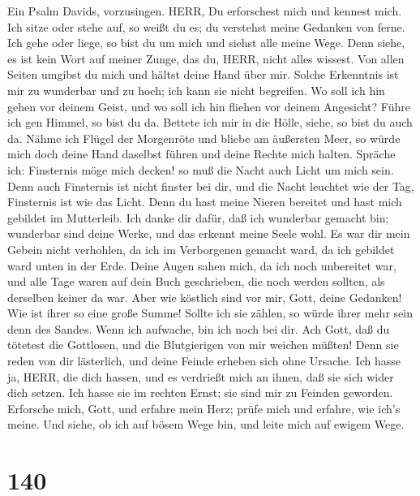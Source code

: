  Ein Psalm Davids, vorzusingen. HERR, Du erforschest mich
und kennest mich.  Ich sitze oder stehe auf, so weißt du es;
du verstehst meine Gedanken von ferne.  Ich gehe oder liege,
so bist du um mich und siehst alle meine Wege.  Denn siehe,
es ist kein Wort auf meiner Zunge, das du, HERR, nicht alles wissest.
 Von allen Seiten umgibst du mich und hältst deine Hand über
mir.  Solche Erkenntnis ist mir zu wunderbar und zu hoch;
ich kann sie nicht begreifen.  Wo soll ich hin gehen vor
deinem Geist, und wo soll ich hin fliehen vor deinem Angesicht?
 Führe ich gen Himmel, so bist du da. Bettete ich mir in die
Hölle, siehe, so bist du auch da.  Nähme ich Flügel der
Morgenröte und bliebe am äußersten Meer,  so würde mich
doch deine Hand daselbst führen und deine Rechte mich halten.
 Spräche ich: Finsternis möge mich decken! so muß die Nacht
auch Licht um mich sein.  Denn auch Finsternis ist nicht
finster bei dir, und die Nacht leuchtet wie der Tag, Finsternis ist wie
das Licht.  Denn du hast meine Nieren bereitet und hast
mich gebildet im Mutterleib.  Ich danke dir dafür, daß ich
wunderbar gemacht bin; wunderbar sind deine Werke, und das erkennt meine
Seele wohl.  Es war dir mein Gebein nicht verhohlen, da ich
im Verborgenen gemacht ward, da ich gebildet ward unten in der Erde.
 Deine Augen sahen mich, da ich noch unbereitet war, und
alle Tage waren auf dein Buch geschrieben, die noch werden sollten, als
derselben keiner da war.  Aber wie köstlich sind vor mir,
Gott, deine Gedanken! Wie ist ihrer so eine große Summe! 
Sollte ich sie zählen, so würde ihrer mehr sein denn des Sandes. Wenn
ich aufwache, bin ich noch bei dir.  Ach Gott, daß du
tötetest die Gottlosen, und die Blutgierigen von mir weichen müßten!
 Denn sie reden von dir lästerlich, und deine Feinde
erheben sich ohne Ursache.  Ich hasse ja, HERR, die dich
hassen, und es verdrießt mich an ihnen, daß sie sich wider dich setzen.
 Ich hasse sie im rechten Ernst; sie sind mir zu Feinden
geworden.  Erforsche mich, Gott, und erfahre mein Herz;
prüfe mich und erfahre, wie ich's meine.  Und siehe, ob ich
auf bösem Wege bin, und leite mich auf ewigem Wege.

\hypertarget{section-139}{%
\section{140}\label{section-139}}

